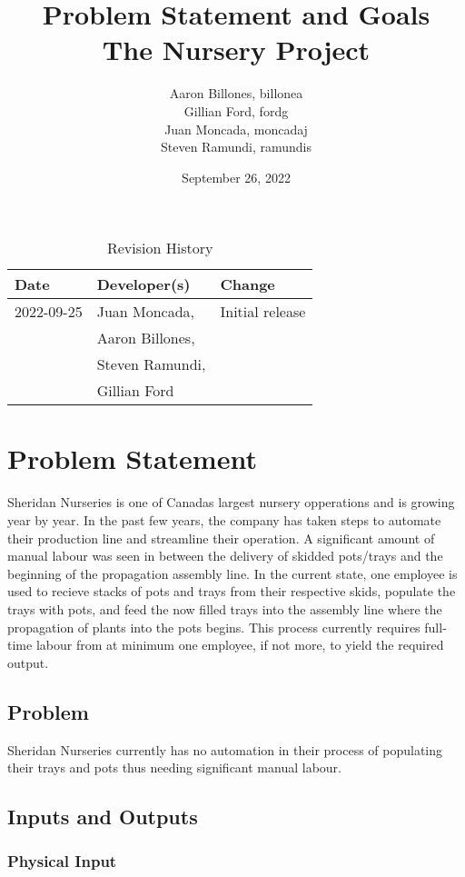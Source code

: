\documentclass{article}
\title{Problem Statement and Goals\\The Nursery Project}
\author{Aaron Billones, billonea\\Gillian Ford, fordg\\Juan Moncada, moncadaj\\Steven Ramundi, ramundis}
\date{September 26, 2022}
\begin{document}
\maketitle

\begin{table}[hp]
\caption{Revision History} \label{TblRevisionHistory}
\begin{tabularx}{\textwidth}{llX}
\toprule
\textbf{Date} & \textbf{Developer(s)} & \textbf{Change}\\
\midrule
2022-09-25 & Juan Moncada,& Initial release\\&Aaron Billones,\\&Steven Ramundi,\\&Gillian Ford \\
 
\bottomrule
\end{tabularx}
\end{table}

\newpage

\section{Problem Statement}

Sheridan Nurseries is one of Canadas largest nursery opperations and is growing year by year.
In the past few years, the company has taken steps to automate their production line and streamline their operation.
A significant amount of manual labour was seen in between the delivery of skidded pots/trays and the beginning of the propagation 
assembly line. In the current state, one employee is used to recieve stacks of pots and trays from their respective skids,
populate the trays with pots, and feed the now filled trays into the assembly line where the propagation of plants into the pots begins.
This process currently requires full-time labour from at minimum one employee, if not more, to yield the required output.

\subsection{Problem}
Sheridan Nurseries currently has no automation in their process of populating their 
trays and pots thus needing significant manual labour.

\subsection{Inputs and Outputs}
\subsubsection{Physical Input}
\end{document}
